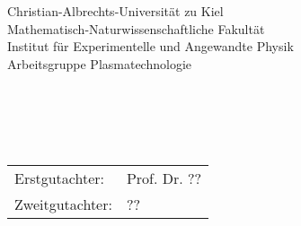\begin{titlepage}
\cleardoublepage{}
   
\begin{minipage}[t]{.6\linewidth} %
     \vspace*{0pt} {\Large Christian-Albrechts-Universität zu Kiel\\}
                Mathematisch-Naturwissenschaftliche Fakultät\\
                Institut für Experimentelle und Angewandte Physik\\
                Arbeitsgruppe Plasmatechnologie\\
\end{minipage}%


\vspace*{4.2cm}

	{\Huge\begin{center}
		{\textbf{\@title}}
	\end{center}}

	\vspace{2.cm}
	
	\begin{center}
		{\large{\textbf{\@subject}}\\}
		\vspace{0.5cm}
	\end{center}

	\vspace{1cm}

	\begin{center}
		{\textbf{}}\\
		{\@author\\}
		\vspace{0.5cm}
		{\@date}
	\end{center}

	\vspace*{\fill}
	\pagestyle{empty}
	
	\begin{flushleft}
	    \begin{tabular}{l l}
            Erstgutachter: & Prof. Dr. ??\\
		    Zweitgutachter: & ??\\
        \end{tabular}
	\end{flushleft}
	

\end{titlepage}